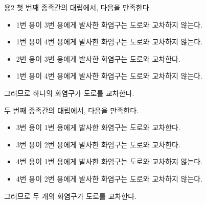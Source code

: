 \begin{problem}{용2}
	첫 번째 종족간의 대립에서, 다음을 만족한다.
	
	\begin{itemize}
		\item 1번 용이 3번 용에게 발사한 화염구는 도로와 교차하지 않는다.
		\item 1번 용이 4번 용에게 발사한 화염구는 도로와 교차하지 않는다.
		\item 2번 용이 3번 용에게 발사한 화염구는 도로와 교차한다.
		\item 1번 용이 4번 용에게 발사한 화염구는 도로와 교차하지 않는다.
	\end{itemize}

	그러므로 하나의 화염구가 도로를 교차한다.
	
	두 번째 종족간의 대립에서, 다음을 만족한다.
	
	\begin{itemize}
		\item 3번 용이 1번 용에게 발사한 화염구는 도로와 교차한다.
		\item 3번 용이 2번 용에게 발사한 화염구는 도로와 교차한다.
		\item 4번 용이 1번 용에게 발사한 화염구는 도로와 교차하지 않는다.
		\item 4번 용이 2번 용에게 발사한 화염구는 도로와 교차하지 않는다.
	\end{itemize}

	그러므로 두 개의 화염구가 도로를 교차한다.

	\begin{example}
	\end{example}
	
	
\end{problem}

